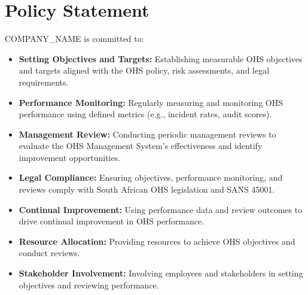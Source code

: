 \documentclass[12pt]{article}
\begin{document}
\section{Policy Statement}
{{COMPANY_NAME}} is committed to:
\begin{itemize}
    \item \textbf{Setting Objectives and Targets:} Establishing measurable OHS objectives and targets aligned with the OHS policy, risk assessments, and legal requirements.
    \item \textbf{Performance Monitoring:} Regularly measuring and monitoring OHS performance using defined metrics (e.g., incident rates, audit scores).
    \item \textbf{Management Review:} Conducting periodic management reviews to evaluate the OHS Management System’s effectiveness and identify improvement opportunities.
    \item \textbf{Legal Compliance:} Ensuring objectives, performance monitoring, and reviews comply with South African OHS legislation and SANS 45001.
    \item \textbf{Continual Improvement:} Using performance data and review outcomes to drive continual improvement in OHS performance.
    \item \textbf{Resource Allocation:} Providing resources to achieve OHS objectives and conduct reviews.
    \item \textbf{Stakeholder Involvement:} Involving employees and stakeholders in setting objectives and reviewing performance.
\end{itemize}
\end{document}
